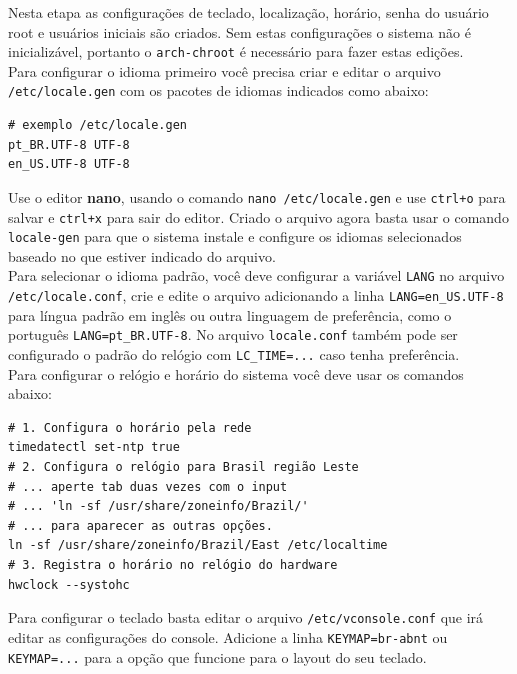 \documentclass[12pt,a4paper]{article}
\begin{document}
Nesta etapa as configurações de teclado, localização, horário, senha do usuário root e usuários iniciais são criados. Sem estas configurações o sistema não é inicializável, portanto o \texttt{arch-chroot} é necessário para fazer estas edições. \\

Para configurar o idioma primeiro você precisa criar e editar o arquivo \texttt{/etc/locale.gen} com os pacotes de idiomas indicados como abaixo: \\

\begin{lstlisting}
# exemplo /etc/locale.gen
pt_BR.UTF-8 UTF-8
en_US.UTF-8 UTF-8
\end{lstlisting}

\vspace{\baselineskip}

Use o editor \textbf{nano}, usando o comando \texttt{nano /etc/locale.gen} e use \texttt{ctrl+o} para salvar e \texttt{ctrl+x} para sair do editor. Criado o arquivo agora basta usar o comando \texttt{locale-gen} para que o sistema instale e configure os idiomas selecionados baseado no que estiver indicado do arquivo.\\

Para selecionar o idioma padrão, você deve configurar a variável \texttt{LANG} no arquivo \texttt{/etc/locale.conf}, crie e edite o arquivo adicionando a linha \texttt{LANG=en\_US.UTF-8} para língua padrão em inglês ou outra linguagem de preferência, como o português \texttt{LANG=pt\_BR.UTF-8}. No arquivo \texttt{locale.conf} também pode ser configurado o padrão do relógio com \texttt{LC\_TIME=...} caso tenha preferência. \\

Para configurar o relógio e horário do sistema você deve usar os comandos abaixo:

\begin{lstlisting}
# 1. Configura o horário pela rede
timedatectl set-ntp true
# 2. Configura o relógio para Brasil região Leste
# ... aperte tab duas vezes com o input 
# ... 'ln -sf /usr/share/zoneinfo/Brazil/'
# ... para aparecer as outras opções.
ln -sf /usr/share/zoneinfo/Brazil/East /etc/localtime 
# 3. Registra o horário no relógio do hardware 
hwclock --systohc 
\end{lstlisting}

\vspace{\baselineskip}

Para configurar o teclado basta editar o arquivo \texttt{/etc/vconsole.conf} que irá editar as configurações do console. Adicione a linha \texttt{KEYMAP=br-abnt} ou \texttt{KEYMAP=...} para a opção que funcione para o layout do seu teclado. \\
\end{document}
